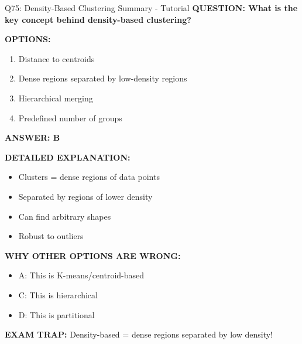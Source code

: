 \documentclass[8pt]{beamer}
\begin{document}
	\begin{frame}{Q75: Density-Based Clustering Summary - Tutorial}
		\fontsize{6.5}{7.5}\selectfont
		\textbf{QUESTION: What is the key concept behind density-based clustering?}
		
		\vspace{0.1cm}
		\textbf{OPTIONS:}
		\begin{enumerate}
			\item Distance to centroids
			\item Dense regions separated by low-density regions
			\item Hierarchical merging
			\item Predefined number of groups
		\end{enumerate}
		
		\vspace{0.1cm}
		\textcolor{myblue}{\textbf{ANSWER: B}}
		
		\vspace{0.1cm}
		\textbf{DETAILED EXPLANATION:}
		\begin{itemize}
			\item Clusters = dense regions of data points
			\item Separated by regions of lower density
			\item Can find arbitrary shapes
			\item Robust to outliers
		\end{itemize}
		
		\vspace{0.1cm}
		\textcolor{myred}{\textbf{WHY OTHER OPTIONS ARE WRONG:}}
		\begin{itemize}
			\item \textcolor{myred}{A:} This is K-means/centroid-based
			\item \textcolor{myred}{C:} This is hierarchical
			\item \textcolor{myred}{D:} This is partitional
		\end{itemize}
		
		\textcolor{myred}{\textbf{EXAM TRAP:}} Density-based = \textcolor{myblue}{dense regions separated by low density}!
	\end{frame}
	
	
\end{document}
